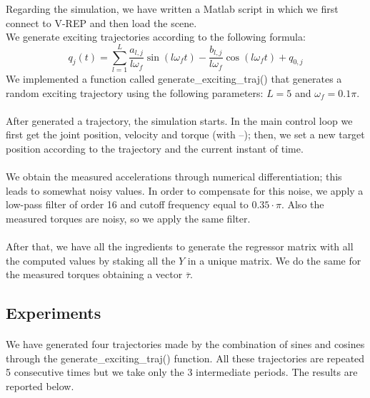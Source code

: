 \documentclass{article}
\begin{document}
\FloatBarrier
Regarding the simulation, we have written a Matlab script in which we first connect to V-REP and then load the scene.\\
We generate exciting trajectories according to the following formula:
\[q_j(t) = \sum_{l=1}^{L}{\frac{ a_{l,j}}{ l\omega_f }\sin(l\omega_f t)-\frac{ b_{l,j}}{l\omega_f}\cos(l\omega_f t)+q_{0,j}}\]
We implemented a function called generate\_exciting\_traj() that generates a random exciting trajectory using the following parameters: $L = 5$ and $\omega_f = 0.1\pi$.
\\\\
After generated a trajectory, the simulation starts. In the main control loop we first get the joint position, velocity and torque (with –); then, we set a new target position according to the trajectory and the current instant of time.
\\\\
We obtain the measured accelerations through numerical differentiation; this leads to somewhat noisy values. In order to compensate for this noise, we apply a low-pass filter of order 16 and cutoff frequency equal to $0.35\cdot\pi$. Also the measured torques are noisy, so we apply the same filter.
\paragraph{}After that, we have all the ingredients to generate the regressor matrix with all the computed values by staking all the $Y$ in a unique matrix. We do the same for the measured torques obtaining a vector $\overline{\tau}$.

\subsection{Experiments}
\paragraph{}We have generated four trajectories made by the combination of sines and cosines through the generate\_exciting\_traj() function. All these trajectories are repeated 5 consecutive times but we take only the 3 intermediate periods. The results are reported below.
\pagebreak
\end{document}
